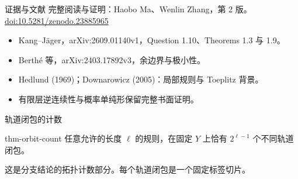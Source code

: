 \documentclass{beamer}
\begin{document}
\appendix

\begin{frame}{证据与文献}
完整阅读与证明：Haobo Ma、Wenlin Zhang，第 2 版。
\medskip
\href{https://doi.org/10.5281/zenodo.23885965}{doi:10.5281/zenodo.23885965}
\begin{itemize}
\item Kang--Jäger，arXiv:2609.01140v1，Question 1.10、Theorems 1.3 与 1.9。
\item Berthé 等，arXiv:2403.17892v3，余边界与极小性。
\item Hedlund (1969)；Downarowicz (2005)：局部规则与 Toeplitz 背景。
\item 有限层逆连续性与概率单纯形保留完整书面证明。
\end{itemize}
\end{frame}

\begin{frame}{轨道闭包的计数}

\begin{bookresult}{thm-orbit-count}
任意允许的长度 $\ell$ 的规则，在固定 $Y$ 上恰有 $2^{\ell-1}$ 个不同轨道闭包。
\end{bookresult}
这是分支结论的拓扑计数部分。每个轨道闭包是一个固定标签切片。
\end{frame}

\FormalVerification
\end{document}
